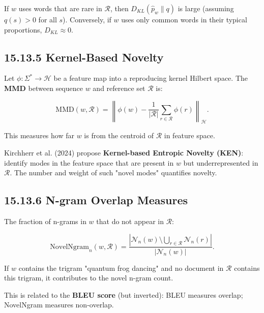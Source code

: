 \begin{proposition}
If $w$ uses words that are rare in $\mathcal{R}$, then $D_{KL}(\hat{p}_w \| q)$ is large (assuming $q(s) > 0$ for all $s$). Conversely, if $w$ uses only common words in their typical proportions, $D_{KL} \approx 0$.
\end{proposition}

\subsection{15.13.5 Kernel-Based Novelty}

\begin{definition}
Let $\phi: \Sigma^* \to \mathcal{H}$ be a feature map into a reproducing kernel Hilbert space. The \textbf{MMD} between sequence $w$ and reference set $\mathcal{R}$ is:

\[\mathrm{MMD}(w, \mathcal{R}) = \left\| \phi(w) - \frac{1}{|\mathcal{R}|} \sum_{r \in \mathcal{R}} \phi(r) \right\|_{\mathcal{H}}.\]

This measures how far $w$ is from the centroid of $\mathcal{R}$ in feature space.
\end{definition}

\begin{definition}
Kirchherr et al. (2024) propose \textbf{Kernel-based Entropic Novelty (KEN)}: identify modes in the feature space that are present in $w$ but underrepresented in $\mathcal{R}$. The number and weight of such "novel modes" quantifies novelty.
\end{definition}

\subsection{15.13.6 N-gram Overlap Measures}

\begin{definition}
The fraction of n-grams in $w$ that do not appear in $\mathcal{R}$:

\[\mathrm{NovelNgram}_n(w, \mathcal{R}) = \frac{|\mathcal{N}_n(w) \setminus \bigcup_{r \in \mathcal{R}} \mathcal{N}_n(r)|}{|\mathcal{N}_n(w)|}.\]
\end{definition}

\begin{example}
If $w$ contains the trigram "quantum frog dancing" and no document in $\mathcal{R}$ contains this trigram, it contributes to the novel n-gram count.

This is related to the \textbf{BLEU score} (but inverted): BLEU measures overlap; NovelNgram measures non-overlap.
\end{example}

